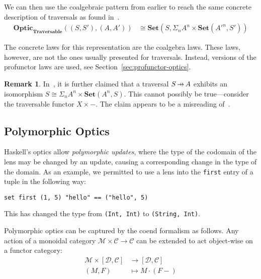 \documentclass[11pt,letterpaper]{article}
\theoremstyle{plain}
\theoremstyle{definition}
\newtheorem{remark}[theorem]{Remark}
\newcommand{\C}{\mathscr{C}}
\newcommand{\D}{\mathscr{D}}
\newcommand{\M}{\mathscr{M}}
\newcommand{\Set}{\mathbf{Set}}
\newcommand{\Traversable}{\mathbf{Traversable}}
\newcommand{\Optic}{\mathbf{Optic}}
\newcommand{\act}{\cdot}
\newcommand{\hto}{\ensuremath{\,\mathaccent\shortmid\rightarrow\,}}
\begin{document}
We can then use the coalgebraic pattern from earlier to reach the same concrete description of traversals as found in~\cite{ProfunctorOptics}.
\begin{align*}
\Optic_\Traversable((S, S'), (A, A')) &\cong \Set(S, \Sigma_n A^n \times \Set(A'^n,S'))
\end{align*}

The concrete laws for this representation are the coalgebra laws. These laws, however, are not the ones usually presented for traversals. Instead, versions of the profunctor laws are used, see Section~\ref{sec:profunctor-optics}.

\begin{remark}
In~\cite[Section 2.3]{ProfunctorOptics}, it is further claimed that a traversal $S \hto A$ exhibits an isomorphism $S \cong \Sigma_n A^n \times \Set(A^n,S)$. This cannot possibly be true---consider the traversable functor $X \times -$. The claim appears to be a misreading of~\cite[Proposition 5.4]{SecondOrderFunctionals}.
\end{remark}



\subsection{Polymorphic Optics}
Haskell's optics allow \emph{polymorphic updates}, where the type of the codomain of the lens may be changed by an update, causing a corresponding change in the type of the domain. As an example, we permitted to use a lens into the \texttt{first} entry of a tuple in the following way:
\begin{verbatim}
set first (1, 5) "hello" == ("hello", 5)
\end{verbatim}
This has changed the type from \texttt{(Int, Int)} to \texttt{(String, Int)}.

Polymorphic optics can be captured by the coend formalism as follows. Any action of a monoidal category $\M \times \C \to \C$ can be extended to act object-wise on a functor category:
\begin{align*}
  \M \times [\D, \C] &\to [\D, \C] \\
  (M, F) &\mapsto  M \act (F-)
\end{align*}
\end{document}
